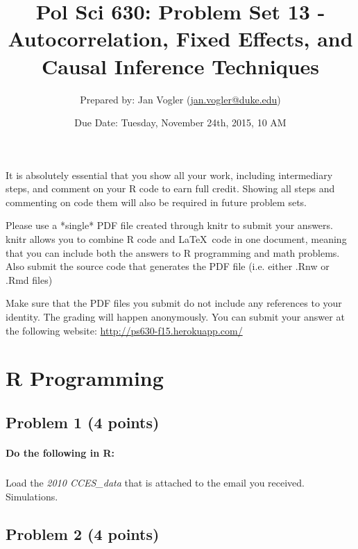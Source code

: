 \documentclass[12pt]{article}
\begin{document}
\title{Pol Sci 630: Problem Set 13 - Autocorrelation, Fixed Effects, and Causal Inference Techniques}

\author{Prepared by: Jan Vogler (\href{mailto:jan.vogler@duke.edu}{jan.vogler@duke.edu})}

\date{Due Date: Tuesday, November 24th, 2015, 10 AM}
 
\maketitle 



It is absolutely essential that you show all your work, including intermediary steps, and comment on your R code to earn full credit. Showing all steps and commenting on code them will also be required in future problem sets.

Please use a *single* PDF file created through knitr to submit your answers. knitr allows you to combine R code and \LaTeX \ code in one document, meaning that you can include both the answers to R programming and math problems. Also submit the source code that generates the PDF file (i.e. either .Rnw or .Rmd files)

Make sure that the PDF files you submit do not include any references to your identity. The grading will happen anonymously. You can submit your answer at the following website: \url{http://ps630-f15.herokuapp.com/}



\section*{R Programming}

\subsection*{Problem 1 (4 points)}

\paragraph{Do the following in R:}

\subparagraph{} Load the \textit{2010 CCES\_data} that is attached to the email you received. Simulations.



\subsection*{Problem 2 (4 points)}
\end{document}
